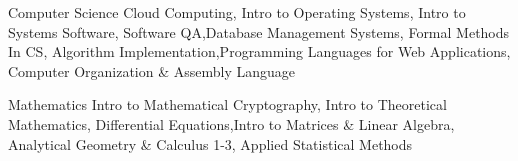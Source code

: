 
\vspace{-1.5mm}
\begin{cvskills}

  \vspace{1mm}

  \cvskill
    {Computer Science} %
    {Cloud Computing, Intro to Operating Systems, Intro to Systems Software, Software QA,\newline Database Management Systems, Formal Methods In CS, Algorithm Implementation,\newline Programming Languages for Web Applications, Computer Organization \& Assembly Language} %

   \cvskill
    {Mathematics} %
	{Intro to Mathematical Cryptography, Intro to Theoretical Mathematics, Differential Equations,\newline Intro to Matrices \& Linear Algebra, Analytical Geometry \& Calculus 1-3, Applied Statistical Methods} %


\end{cvskills}
\vspace{-0.5mm}
